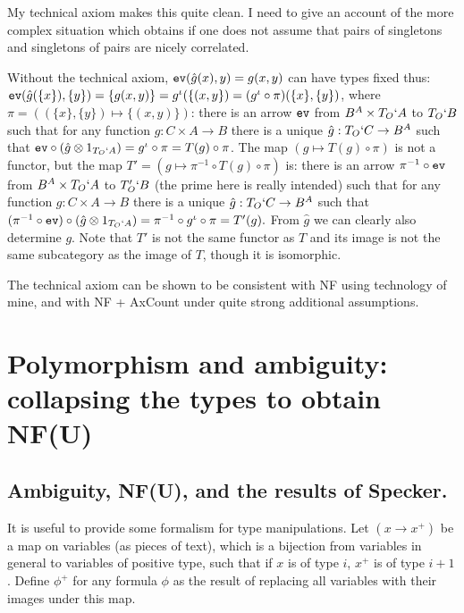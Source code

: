 \documentclass[12pt]{article}
\begin{document}
My technical axiom makes this quite clean.   I need to give an account of the more complex situation which obtains if one does not assume that pairs of singletons and singletons of pairs are nicely correlated.

Without the technical axiom,   ${\tt ev}(\hat g(x),y) = g(x,y)$ can have types fixed thus:  ${\tt ev}(\hat g(\{x\}),\{y\}) = \{g(x,y)\} = g^{\iota}(\{(x,y\}) = (g^{\iota} \circ \pi)(\{x\},\{y\})$, where $\pi = ((\{x\},\{y\}) \mapsto \{(x,y)\})$:   there is an arrow ${\tt ev}$ from $B^A \times T_O`A$  to $T_O`B$  such that for any function $g:C \times A \rightarrow B$ there is a unique
$\hat g :T_O`C \rightarrow B^A$ such that ${\tt ev} \circ (\hat g \otimes 1_{T_O`A}) = g^\iota \circ \pi = T(g)\circ \pi$.  The map $(g \mapsto T(g) \circ \pi)$ is not a functor, but the map
$T' = (g \mapsto \pi^{-1} \circ T(g) \circ \pi)$ is:   there is an arrow ${\pi^{-1} \circ \tt ev}$ from $B^A \times T_O`A$ to $T'_O`B$ (the prime here is really intended) such that for any function $g:C \times A \rightarrow B$ there is a unique
$\hat g :T_O`C \rightarrow B^A$ such that $(\pi^{-1} \circ {\tt ev}) \circ (\hat g \otimes 1_{T_O`A}) = \pi^{-1} \circ g^\iota \circ \pi = T'(g).$   From $\hat g$ we can clearly also determine $g$.  Note that $T'$ is not the same functor as $T$ and its image is not the same subcategory as the image of $T$, though it is isomorphic. 



The technical axiom can be shown to be consistent with NF using technology of mine, and with NF + AxCount under quite strong additional assumptions.  

\section{Polymorphism and ambiguity: collapsing the types to obtain NF(U)}

\subsection{Ambiguity, NF(U), and the results of Specker.}

It is useful to provide some formalism for type manipulations.  Let $(x \rightarrow x^+)$ be a map on variables (as pieces of text), which is a bijection from variables in general to variables of positive type,
such that if $x$ is of type $i$, $x^+$ is of type $i+1$.  Define $\phi^+$ for any formula $\phi$ as the result of replacing all variables with their images under this map.
\end{document}
